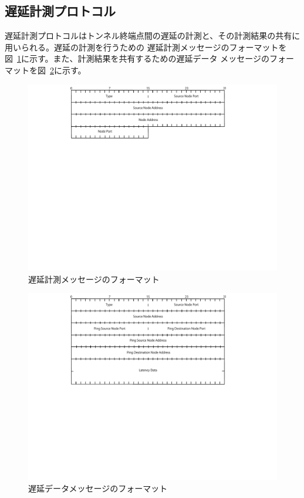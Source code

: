 \subsection{遅延計測プロトコル}
\label{solv:latencyprotocol}

遅延計測プロトコルはトンネル終端点間の遅延の計測と、その計測結果の共有に用いられる。遅延の計測を行うための
遅延計測メッセージのフォーマットを図~\ref{img:ldcmessage}に示す。また、計測結果を共有するための遅延データ
メッセージのフォーマットを図~\ref{img:ldmessage}に示す。


\begin{figure}[h]
	\begin{center}
		\includegraphics[scale=1.0]{./img/controlmessage}
		\caption{遅延計測メッセージのフォーマット}
		\label{img:ldcmessage}
	\end{center}
\end{figure}

\begin{figure}[h]
	\begin{center}
		\includegraphics[scale=1.0]{./img/latencydatamessage}
		\caption{遅延データメッセージのフォーマット}
		\label{img:ldmessage}
	\end{center}
\end{figure}


